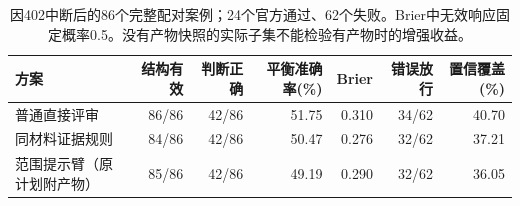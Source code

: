 \begin{table}[t]
\caption{因402中断后的86个完整配对案例；24个官方通过、62个失败。Brier中无效响应固定概率0.5。没有产物快照的实际子集不能检验有产物时的增强收益。}\label{tab:external-judge}
\centering\small
\begin{tabularx}{\textwidth}{Xrrrrrr}
\toprule
方案 & 结构有效 & 判断正确 & 平衡准确率(\%) & Brier & 错误放行 & 置信覆盖(\%) \\
\midrule
普通直接评审 & 86/86 & 42/86 & 51.75 & 0.310 & 34/62 & 40.70 \\
同材料证据规则 & 84/86 & 42/86 & 50.47 & 0.276 & 32/62 & 37.21 \\
范围提示臂（原计划附产物） & 85/86 & 42/86 & 49.19 & 0.290 & 32/62 & 36.05 \\
\bottomrule
\end{tabularx}
\end{table}
